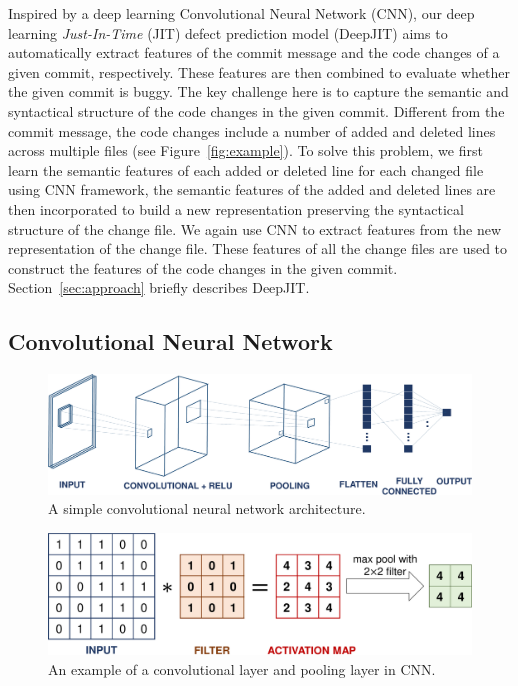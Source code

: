 Inspired by a deep learning Convolutional Neural Network (CNN), our deep learning \emph{Just-In-Time} (JIT) defect prediction model (DeepJIT) aims to automatically extract features of the commit message and the code changes of a given commit, respectively. These features are then combined to evaluate whether the given commit is buggy. The key challenge here is to capture the semantic and syntactical structure of the code changes in the given commit. Different from the commit message, the code changes include a number of added and deleted lines across multiple files (see Figure~\ref{fig:example}). To solve this problem, we first learn the semantic features of each added or deleted line for each changed file using CNN framework, the semantic features of the added and deleted lines are then incorporated to build a new representation preserving the syntactical structure of the change file. We again use CNN to extract features from the new representation of the change file. These features of all the change files are used to construct the features of the code changes in the given commit. Section~\ref{sec:approach} briefly describes DeepJIT. 

\subsection{Convolutional Neural Network}
\label{sec:background_cnn}

\begin{figure}[t!]
	\center
	\includegraphics[scale=0.3]{figs/cnn.pdf}
	\caption{A simple convolutional neural network architecture.}
	\label{fig:cnn}
\end{figure}

\begin{figure}[t!]
	\center
	\includegraphics[scale=0.3]{figs/filter_pooling.pdf}
	\caption{An example of a convolutional layer and pooling layer in CNN.}
	\label{fig:filter}
\end{figure}


